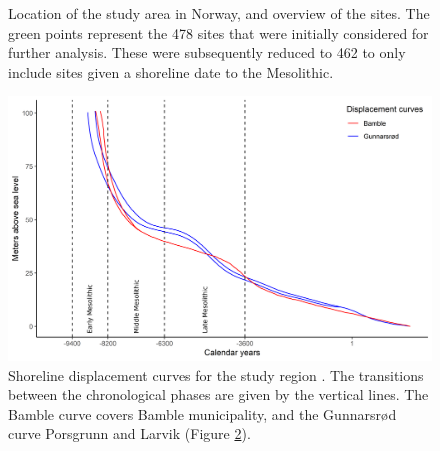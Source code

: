 \documentclass[12pt, a4paper]{article}
\begin{document}
\begin{figure}[h]
	\centering
	\caption{Location of the study area in Norway, and overview of the sites. The green
		points represent the 478 sites that were initially considered for further analysis. These
		were subsequently reduced to 462 to only include sites given a shoreline date to the Mesolithic.}
	\label{fig:overview}
\end{figure}
\begin{figure}[h]
	\centering
	\includegraphics[width = \linewidth]{displacement.png}
	\caption{Shoreline displacement curves for the study region \citep[after][]{sorensen2014, sorensen2015}. The transitions between the chronological phases are given by the vertical lines. The Bamble curve covers Bamble municipality, and the Gunnarsr{\o}d curve Porsgrunn and Larvik (Figure \ref{fig:displacement}).}
	\label{fig:displacement}
\end{figure}
\end{document}
